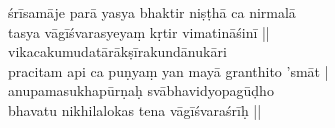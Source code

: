 \documentclass[12pt]{article}
\begin{document}
\setlength\parindent{0pt}
śrīsamāje parā yasya bhaktir niṣṭhā ca nirmalā\\
tasya vāgīśvarasyeyaṃ kṛtir vimatināśinī\footnoteB{
	vimatināśinī] \EDD ; vimatināsanī \MS
} ||\\

% 
% 
 
vikacakumudatārākṣīrakundānukāri\footnoteB{
	vikacakumudatārākṣīrakundānukāri \emd ; vikacakumudakṣīratārakundānukāri] \EDD ; vikarektāmudakṣīratārākundānukāri \MS
}\\
pracitam api ca puṇyaṃ yan mayā granthito 'smāt |\\
anupamasukhapūrṇaḥ svābhavidyopagūḍho\\
bhavatu nikhilalokas tena vāgīśvaraśrīḥ ||\\


% 
 
\end{document}
